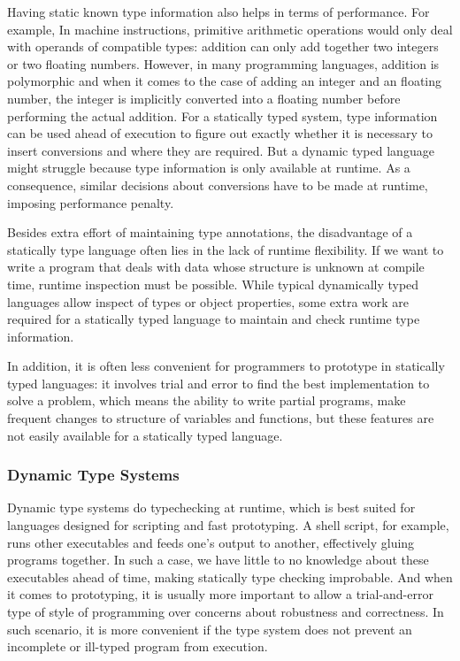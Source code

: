 Having static known type information also helps in terms of performance.
For example, In machine instructions, primitive arithmetic operations
would only deal with operands of compatible types: addition can only add together
two integers or two floating numbers.
However, in many programming languages,
addition is polymorphic and when it comes to the case of adding an integer
and an floating number, the integer is implicitly converted into a floating number before
performing the actual addition.
For a statically typed system, type information can be used ahead of execution
to figure out exactly whether it is necessary to insert conversions
and where they are required.
But a dynamic typed language might struggle because type information
is only available at runtime.
As a consequence, similar decisions about conversions have to be made at runtime,
imposing performance penalty.

Besides extra effort of maintaining type annotations,
the disadvantage of a statically type language often lies in the lack of runtime flexibility.
If we want to write a program that deals with data whose structure is
unknown at compile time, runtime inspection must be possible.
While typical dynamically typed languages allow inspect of types or object properties,
some extra work are required for a statically typed language
to maintain and check runtime type information.

In addition, it is often less convenient for programmers to prototype
in statically typed languages: it involves trial and error to find the best implementation
to solve a problem, which means the ability to write partial programs,
make frequent changes to structure of variables and functions, but these features are not easily available for a statically typed language.

\subsubsection{Dynamic Type Systems}

Dynamic type systems do typechecking at runtime, which is best suited for
languages designed for scripting and fast prototyping.
A shell script, for example, runs other executables and feeds one's output to another,
effectively gluing programs together.
In such a case, we have little to no knowledge about these executables ahead of time,
making statically type checking improbable.
And when it comes to prototyping,
it is usually more important to allow a trial-and-error type of style of programming
over concerns about robustness and correctness.
In such scenario, it is more convenient if the type system does not prevent
an incomplete or ill-typed program from execution.

